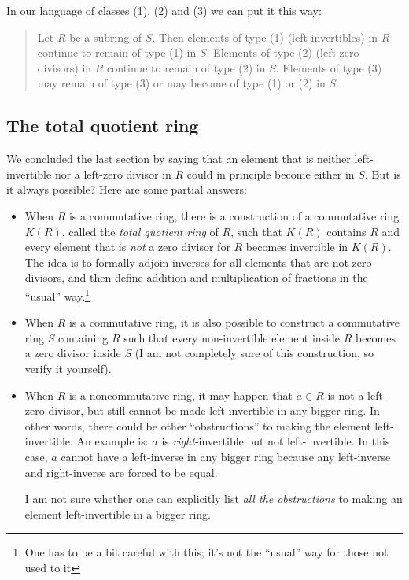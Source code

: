 \documentclass[a4paper]{amsart}
\begin{document}
In our language of classes (1), (2) and (3) we can put it this way:

\begin{quote}
  Let $R$ be a subring of $S$. Then elements of type (1)
  (left-invertibles) in $R$ continue to remain of type (1) in
  $S$. Elements of type (2) (left-zero divisors) in $R$ continue to
  remain of type (2) in $S$. Elements of type (3) may remain of type
  (3) or may become of type (1) or (2) in $S$.
\end{quote}

\subsection{The total quotient ring}

We concluded the last section by saying that an element that is
neither left-invertible nor a left-zero divisor in $R$ could in
principle become either in $S$. But is it always possible? Here are
some partial answers:

\begin{itemize}

\item When $R$ is a commutative ring, there is a construction of a
  commutative ring $K(R)$, called the {\em total quotient ring} of
  $R$, such that $K(R)$ contains $R$ and every element that is {\em
    not} a zero divisor for $R$ becomes invertible in $K(R)$. The idea
  is to formally adjoin inverses for all elements that are not zero
  divisors, and then define addition and multiplication of fractions
  in the ``usual'' way.\footnote{One has to be a bit careful with
    this; it's not the ``usual'' way for those not used to it}

\item When $R$ is a commutative ring, it is also possible to construct
  a commutative ring $S$ containing $R$ such that every non-invertible
  element inside $R$ becomes a zero divisor inside $S$ (I am not
  completely sure of this construction, so verify it yourself).

\item When $R$ is a noncommutative ring, it may happen that $a \in R$
  is not a left-zero divisor, but still cannot be made left-invertible
  in any bigger ring. In other words, there could be other
  ``obstructions'' to making the element left-invertible. An example
  is: $a$ is {\em right}-invertible but not left-invertible. In this
  case, $a$ cannot have a left-inverse in any bigger ring because any
  left-inverse and right-inverse are forced to be equal.

  I am not sure whether one can explicitly list {\em all the obstructions}
  to making an element left-invertible in a bigger ring.

\end{itemize}
\end{document}
